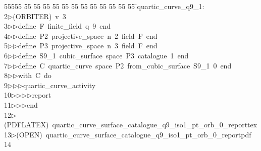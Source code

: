 %
%
\begin{tabbing}
55555 \= 55 \= 55 \= 55 \= 55 \= 55 \= 55 \= 55 \= 55 \= 55 \= 55 \= 55 \= 55 \= \>quartic\_curve\_q9\_1:\\[0pt]
2\>$\triangleright$\>(ORBITER)\ v\ 3\ \\[0pt]
3\>$\triangleright$\>$\triangleright$\>define\ F\ finite\_field\ q\ 9\ end\ \\[0pt]
4\>$\triangleright$\>$\triangleright$\>define\ P2\ projective\_space\ n\ 2\ field\ F\ end\ \\[0pt]
5\>$\triangleright$\>$\triangleright$\>define\ P3\ projective\_space\ n\ 3\ field\ F\ end\ \\[0pt]
6\>$\triangleright$\>$\triangleright$\>define\ S9\_1\ cubic\_surface\ space\ P3\ catalogue\ 1\ end\ \\[0pt]
7\>$\triangleright$\>$\triangleright$\>define\ C\ quartic\_curve\ space\ P2\ from\_cubic\_surface\ S9\_1\ 0\ end\ \\[0pt]
8\>$\triangleright$\>$\triangleright$\>with\ C\ do\ \\[0pt]
9\>$\triangleright$\>$\triangleright$\>$\triangleright$\>quartic\_curve\_activity\ \\[0pt]
10\>$\triangleright$\>$\triangleright$\>$\triangleright$\>$\triangleright$\>report\ \\[0pt]
11\>$\triangleright$\>$\triangleright$\>$\triangleright$\>end\\[0pt]
12\>$\triangleright$\>(PDFLATEX)\ quartic\_curve\_surface\_catalogue\_q9\_iso1\_pt\_orb\_0\_reporttex\\[0pt]
13\>$\triangleright$\>(OPEN)\ quartic\_curve\_surface\_catalogue\_q9\_iso1\_pt\_orb\_0\_reportpdf\\[0pt]
14\>\end{tabbing}
